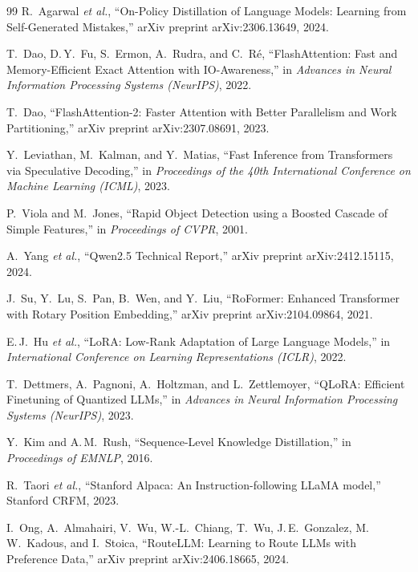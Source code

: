 \begin{thebibliography}{99}
R.~Agarwal \textit{et al.}, ``On-Policy Distillation of Language Models: Learning from Self-Generated Mistakes,'' arXiv preprint arXiv:2306.13649, 2024.

T.~Dao, D.\,Y.~Fu, S.~Ermon, A.~Rudra, and C.~Ré, ``FlashAttention: Fast and Memory-Efficient Exact Attention with IO-Awareness,'' in \textit{Advances in Neural Information Processing Systems (NeurIPS)}, 2022.

T.~Dao, ``FlashAttention-2: Faster Attention with Better Parallelism and Work Partitioning,'' arXiv preprint arXiv:2307.08691, 2023.

Y.~Leviathan, M.~Kalman, and Y.~Matias, ``Fast Inference from Transformers via Speculative Decoding,'' in \textit{Proceedings of the 40th International Conference on Machine Learning (ICML)}, 2023.

P.~Viola and M.~Jones, ``Rapid Object Detection using a Boosted Cascade of Simple Features,'' in \textit{Proceedings of CVPR}, 2001.

A.~Yang \textit{et al.}, ``Qwen2.5 Technical Report,'' arXiv preprint arXiv:2412.15115, 2024.

J.~Su, Y.~Lu, S.~Pan, B.~Wen, and Y.~Liu, ``RoFormer: Enhanced Transformer with Rotary Position Embedding,'' arXiv preprint arXiv:2104.09864, 2021.

E.\,J.~Hu \textit{et al.}, ``LoRA: Low-Rank Adaptation of Large Language Models,'' in \textit{International Conference on Learning Representations (ICLR)}, 2022.

T.~Dettmers, A.~Pagnoni, A.~Holtzman, and L.~Zettlemoyer, ``QLoRA: Efficient Finetuning of Quantized LLMs,'' in \textit{Advances in Neural Information Processing Systems (NeurIPS)}, 2023.

Y.~Kim and A.\,M.~Rush, ``Sequence-Level Knowledge Distillation,'' in \textit{Proceedings of EMNLP}, 2016.

R.~Taori \textit{et al.}, ``Stanford Alpaca: An Instruction-following LLaMA model,'' Stanford CRFM, 2023.

I.~Ong, A.~Almahairi, V.~Wu, W.-L.~Chiang, T.~Wu, J.\,E.~Gonzalez, M.\,W.~Kadous, and I.~Stoica, ``RouteLLM: Learning to Route LLMs with Preference Data,'' arXiv preprint arXiv:2406.18665, 2024.

\end{thebibliography}
